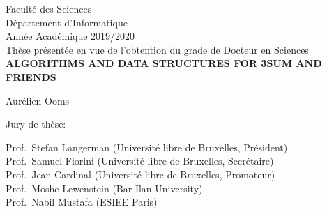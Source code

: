 \vspace*{\fill}
\begin{center}
Facult\'{e} des Sciences\\[1.5pt]
D\'{e}partement d'Informatique \\[1.5pt]
Ann\'{e}e Acad\'{e}mique 2019/2020 \\[1cm]
Th\`{e}se pr\'{e}sent\'{e}e en vue de l'obtention du grade de Docteur en Sciences \\[2cm]
\textbf{\LARGE{ALGORITHMS AND DATA STRUCTURES FOR 3SUM AND FRIENDS}}
\end{center}

\begin{center}
\vspace{1cm}
{\large Aurélien Ooms} \\[2cm]
\end{center}

\begin{center}
	Jury de th\`{e}se:
\end{center}
\begin{flushleft}
Prof.~Stefan Langerman (Université libre de Bruxelles, Président) \\
Prof.~Samuel Fiorini (Université libre de Bruxelles, Secrétaire) \\
Prof.~Jean Cardinal (Université libre de Bruxelles, Promoteur) \\
Prof.~Moshe Lewenstein (Bar Ilan University) \\
Prof.~Nabil Mustafa (ESIEE Paris)
\end{flushleft}
\vspace*{\fill}

